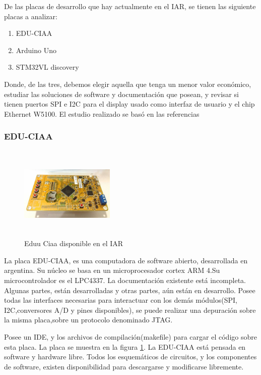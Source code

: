  De las placas de desarrollo que hay actualmente en el IAR, se tienen las siguiente placas a analizar: 
 
\begin{enumerate}
	\item EDU-CIAA
	\item Arduino Uno 
	\item STM32VL discovery 
\end{enumerate}
Donde, de las tres, debemos elegir aquella que tenga un menor valor económico, estudiar las soluciones de software y documentación que posean, y revisar si tienen puertos SPI e I2C para el display usado como interfaz de usuario y el chip Ethernet W5100. El estudio realizado se basó en las referencias \cite{placastm32vl,arduno,eduuciaaa}  

\subsubsection{EDU-CIAA}

\begin{figure}
	\includegraphics[width=0.4\textwidth , height=  45mm]{edu_ciaa}
	\caption{Eduu Ciaa disponible en el IAR}
	\label{fig:edu_ciaa}
\end{figure}
La placa EDU-CIAA, es una computadora de software abierto, desarrollada en argentina. Su núcleo se basa en un microprocesador cortex ARM 4.Su microcontrolador es el LPC4337. La documentación existente está incompleta. Algunas partes, están desarrolladas y otras partes, aún están en desarrollo. Posee todas las interfaces necesarias para interactuar con los demás módulos(SPI, I2C,conversores A/D y pines disponibles), se puede realizar una depuración sobre la misma placa,sobre un protocolo denominado JTAG. 


Posee un IDE, y los archivos de compilación(makefile) para cargar el código sobre esta placa. La placa se muestra en la figura \ref{fig:edu_ciaa}. La EDU-CIAA está pensada en software y hardware libre. Todos los esquemáticos de circuitos, y los componentes de software, existen disponibilidad para descargarse y modificarse libremente. 


